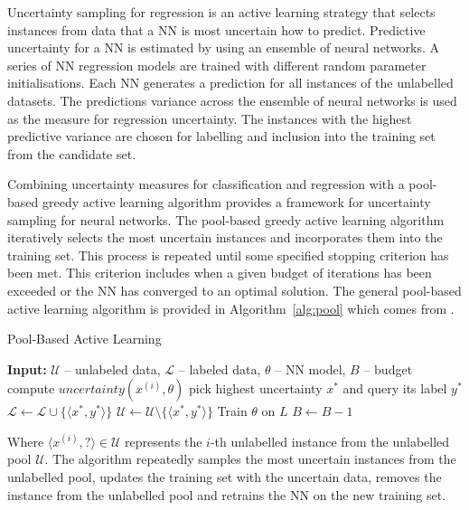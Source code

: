 \documentclass[conference]{IEEEtran}
\begin{document}
	Uncertainty sampling for regression is an active learning strategy that selects instances from data that a NN is most uncertain how to predict. Predictive uncertainty for a NN is estimated by using an ensemble of neural networks. A series of NN regression models are trained with different random parameter initialisations. Each NN generates a prediction for all instances of the unlabelled datasets. The predictions variance across the ensemble of neural networks is used as the measure for regression uncertainty. The instances with the highest predictive variance are chosen for labelling and inclusion into the training set from the candidate set.
	
	Combining uncertainty measures for classification and regression with a pool-based greedy active learning algorithm provides a framework for uncertainty sampling for neural networks. The pool-based greedy active learning algorithm iteratively selects the most uncertain instances and incorporates them into the training set. This process is repeated until some specified stopping criterion has been met. This criterion includes when a given budget of iterations has been exceeded or the NN has converged to an optimal solution. The general pool-based active learning algorithm is provided in Algorithm~\ref{alg:pool} which comes from \cite{sharma2017}.
	
	\begin{algorithm}[H]
		\caption{Pool-Based Active Learning}
		\label{alg:pool}
		\begin{algorithmic}[1]
			\State\textbf{Input:} $\mathcal{U}$ -- unlabeled data, $\mathcal{L}$ -- labeled data, $\theta$ -- NN model, $B$ -- budget
			\Repeat
			\State compute $uncertainty(x^{(i)}, \theta)$
			\EndFor
			\State pick highest uncertainty $x^{*}$ and query its label $y^{*}$
			\State $\mathcal{L} \gets \mathcal{L} \cup \{\langle x^{*}, y^{*}\rangle\}$
			\State $\mathcal{U} \gets \mathcal{U} \setminus \{\langle x^{*}, y^{*}\rangle\}$
			\State Train $\theta$ on $L$
			\State $B \gets B - 1$
		\end{algorithmic}
	\end{algorithm}
	
	Where $\langle x^{(i)}, ? \rangle \in \mathcal{U}$ represents the $i$-th unlabelled instance from the unlabelled pool $\mathcal{U}$. The algorithm repeatedly samples the most uncertain instances from the unlabelled pool, updates the training set with the uncertain data, removes the instance from the unlabelled pool and retrains the NN on the new training set.
	
\end{document}
